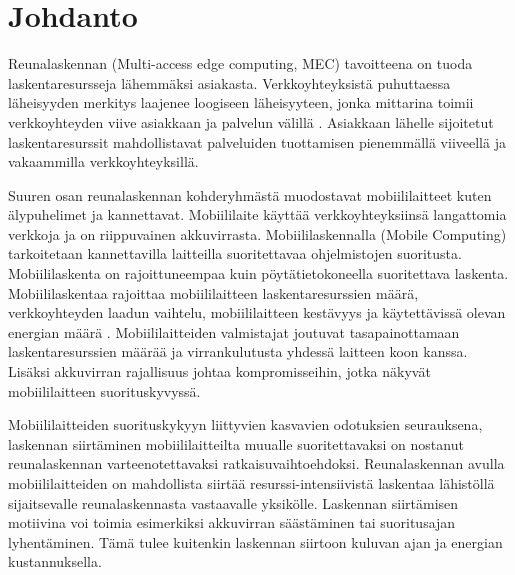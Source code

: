 
\section{Johdanto}
Reunalaskennan (Multi-access edge computing, MEC) tavoitteena on tuoda laskentaresursseja lähemmäksi asiakasta.
Verkkoyhteyksistä puhuttaessa läheisyyden merkitys laajenee loogiseen läheisyyteen, jonka mittarina toimii verkkoyhteyden viive asiakkaan ja palvelun välillä \cite{satyanarayanan2017emergence}.
Asiakkaan lähelle sijoitetut laskentaresurssit mahdollistavat palveluiden tuottamisen pienemmällä viiveellä ja vakaammilla verkkoyhteyksillä.



Suuren osan reunalaskennan kohderyhmästä muodostavat mobiililaitteet kuten älypuhelimet ja kannettavat. 
Mobiililaite käyttää verkkoyhteyksiinsä langattomia verkkoja ja on riippuvainen akkuvirrasta.
Mobiililaskennalla (Mobile Computing) tarkoitetaan kannettavilla laitteilla suoritettavaa ohjelmistojen suoritusta. 
Mobiililaskenta on rajoittuneempaa kuin pöytätietokoneella suoritettava laskenta. Mobiililaskentaa rajoittaa mobiililaitteen laskentaresurssien määrä, verkkoyhteyden laadun vaihtelu, mobiililaitteen kestävyys ja käytettävissä olevan energian määrä \cite{satya96}. 
Mobiililaitteiden valmistajat joutuvat tasapainottamaan laskentaresurssien määrää ja virrankulutusta yhdessä laitteen koon kanssa. Lisäksi akkuvirran rajallisuus johtaa kompromisseihin, jotka näkyvät mobiililaitteen suorituskyvyssä\cite{satya01pervasive}.

Mobiililaitteiden suorituskykyyn liittyvien kasvavien odotuksien seurauksena, laskennan siirtäminen mobiililaitteilta muualle suoritettavaksi on nostanut reunalaskennan varteenotettavaksi ratkaisuvaihtoehdoksi. Reunalaskennan avulla mobiililaitteiden on mahdollista siirtää resurssi-intensiivistä laskentaa lähistöllä sijaitsevalle reunalaskennasta vastaavalle yksikölle. 
Laskennan siirtämisen motiivina voi toimia esimerkiksi akkuvirran säästäminen tai suoritusajan lyhentäminen. Tämä tulee kuitenkin laskennan siirtoon kuluvan ajan ja energian kustannuksella. 

